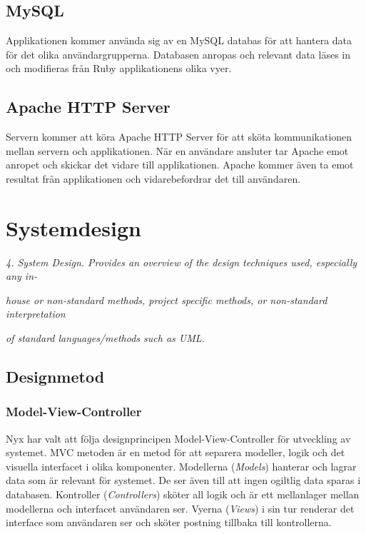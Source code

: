 \documentclass[a4paper, twoside, 11pt, titlepage]{article}
\begin{document}
	\subsection{MySQL}


	Applikationen kommer använda sig av en MySQL databas för att hantera data för det olika användargrupperna. Databasen anropas och relevant data läses in och modifieras från Ruby applikationens olika vyer.

	\subsection{Apache HTTP Server}


	Servern kommer att köra Apache HTTP Server för att sköta kommunikationen mellan servern och applikationen. När en användare ansluter tar Apache emot anropet och skickar det vidare till applikationen. Apache kommer även ta emot resultat från applikationen och vidarebefordrar det till användaren.

\clearpage
\section{Systemdesign}


\emph{4. System Design. Provides an overview of the design techniques used, especially any in-}

\emph{house or non-standard methods, project specific methods, or non-standard interpretation}

\emph{of standard languages/methods such as UML.}

	\subsection{Designmetod}



		\subsubsection{Model-View-Controller}


		Nyx har valt att följa designprincipen Model-View-Controller för utveckling av systemet. MVC metoden är en metod för att separera modeller, logik och det visuella interfacet i olika komponenter. Modellerna (\emph{Models}) hanterar och lagrar data som är relevant för systemet. De ser även till att ingen ogiltlig data sparas i databasen. Kontroller (\emph{Controllers}) sköter all logik och är ett mellanlager mellan modellerna och interfacet användaren ser. Vyerna (\emph{Views}) i sin tur renderar det interface som användaren ser och sköter postning tillbaka till kontrollerna.
\end{document}
